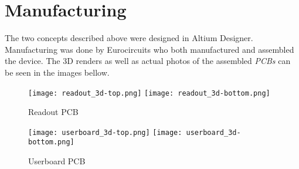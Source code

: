\section{Manufacturing}
The two concepts described above were designed in Altium Designer. Manufacturing was done by Eurocircuits who both manufactured and assembled the device. The 3D renders as well as actual photos of the assembled \emph{PCBs} can be seen in the images bellow. 
\newpage
\FloatBarrier
\begin{figure}[htp!]
    \centering
    \texttt{[image: readout\_3d-top.png]}
    \texttt{[image: readout\_3d-bottom.png]}
    \caption{Readout PCB}
    \label{fig:readout_3d}
\end{figure}
\FloatBarrier

\FloatBarrier
\begin{figure}[htp!]
    \centering
    \texttt{[image: userboard\_3d-top.png]}
    \hspace{1.8cm}
    \texttt{[image: userboard\_3d-bottom.png]}
    \caption{Userboard PCB}
    \label{fig:userboard_3d}
\end{figure}
\FloatBarrier